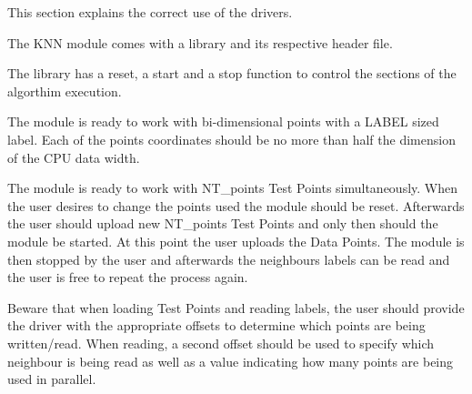 \noindent This section explains the correct use of the drivers.

\noindent The KNN module comes with a library and its respective header file.

\noindent The library has a reset, a start and a stop function to control the sections of the algorthim execution.

\noindent The module is ready to work with bi-dimensional points with a LABEL sized label. Each of the points coordinates should be no more than half the dimension of the CPU data width.

\noindent The module is ready to work with NT\_points Test Points simultaneously. When the user desires to change the points used the module should be reset. Afterwards the user should upload new NT\_points Test Points and only then should the module be started. At this point the user uploads the Data Points. The module is then stopped by the user and afterwards the neighbours labels can be read and the user is free to repeat the process again.

\noindent Beware that when loading Test Points and reading labels, the user should provide the driver with the appropriate offsets to determine which points are being written/read. When reading, a second offset should be used to specify which neighbour is being read as well as a value indicating how many points are being used in parallel.

